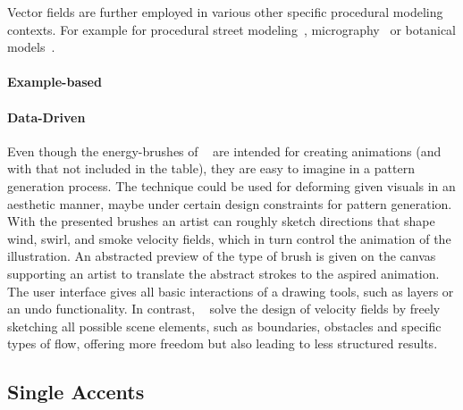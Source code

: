 Vector fields are further employed in various other specific procedural modeling contexts. For example for procedural street modeling~\cite{chen_2008_ips}, micrography~\cite{maharik_2011_dm} or botanical models~\cite{xu_2015_ptm}.

\paragraph*{Example-based}

\paragraph*{Data-Driven}
Even though the energy-brushes of \citeauthor*{xing_2016_eit}~\cite{xing_2016_eit} are intended for creating animations (and with that not included in the table), they are easy to imagine in a pattern generation process. The technique could be used for deforming given visuals in an aesthetic manner, maybe under certain design constraints for pattern generation. With the presented brushes an artist can roughly sketch directions that shape wind, swirl, and smoke velocity fields, which in turn control the animation of the illustration. An abstracted preview of the type of brush is given on the canvas supporting an artist to translate the abstract strokes to the aspired animation. The user interface gives all basic interactions of a drawing tools, such as layers or an undo functionality. In contrast, \citeauthor*{hu_2019_ssf}~\cite{hu_2019_ssf} solve the design of velocity fields by freely sketching all possible scene elements, such as boundaries, obstacles and specific types of flow, offering more freedom but also leading to less structured results. 


\subsection{Single Accents}
\label{subsubsec:analysis_single_accents}

